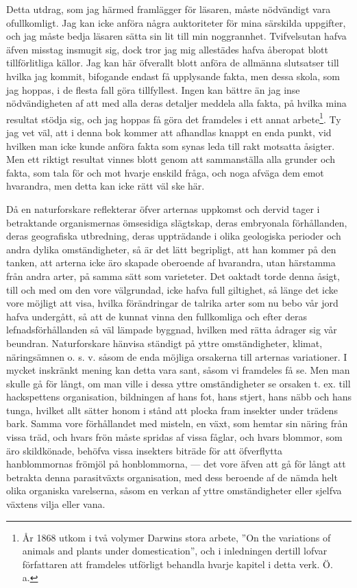 Detta utdrag, som jag härmed framlägger för läsaren, måste nödvändigt vara ofullkomligt. Jag kan icke anföra några auktoriteter för mina särskilda uppgifter, och jag måste bedja läsaren sätta sin lit till min noggrannhet. Tvifvelsutan hafva äfven misstag insmugit sig, dock tror jag mig allestädes hafva åberopat blott tillförlitliga källor. Jag kan här öfverallt blott anföra de allmänna slutsatser till hvilka jag kommit, bifogande endast få upplysande fakta, men dessa skola, som jag hoppas, i de flesta fall göra tillfyllest. Ingen kan bättre än jag inse nödvändigheten af att med alla deras detaljer meddela alla fakta, på hvilka mina resultat stödja sig, och jag hoppas få göra det framdeles i ett annat arbete\footnote{År 1868 utkom i två volymer Darwins stora arbete, ”On the variations of animals and plants under domestication”, och i inledningen dertill lofvar författaren att framdeles utförligt behandla hvarje kapitel i detta verk.
Ö. a.}. Ty jag vet väl, att i denna bok kommer att afhandlas knappt en enda punkt, vid hvilken man icke kunde anföra fakta som synas leda till rakt motsatta åsigter. Men ett riktigt resultat vinnes blott genom att sammanställa alla grunder och fakta, som tala för och mot hvarje enskild fråga, och noga afväga dem emot hvarandra, men detta kan icke rätt väl ske här.

Då en naturforskare reflekterar öfver arternas uppkomst och dervid tager i betraktande organismernas ömsesidiga slägtskap, deras embryonala förhållanden, deras geografiska utbredning, deras uppträdande i olika geologiska perioder och andra dylika omständigheter, så är det lätt begripligt, att han kommer på den tanken, att arterna icke äro skapade oberoende af hvarandra, utan härstamma från andra arter, på samma sätt som varieteter. Det oaktadt torde denna åsigt, till och med om den vore välgrundad, icke hafva full giltighet, så länge det icke vore möjligt att visa, hvilka förändringar de talrika arter som nu bebo vår jord hafva undergått, så att de kunnat vinna den fullkomliga och efter deras lefnadsförhållanden så väl lämpade byggnad, hvilken med rätta ådrager sig vår beundran. Naturforskare hänvisa ständigt på yttre omständigheter, klimat, näringsämnen o. s. v. såsom de enda möjliga orsakerna till arternas variationer. I mycket inskränkt mening kan detta vara sant, såsom vi framdeles få se. Men man skulle gå för långt, om man ville i dessa yttre omständigheter se orsaken t. ex. till hackspettens organisation, bildningen af hans fot, hans stjert, hans näbb och hans tunga, hvilket allt sätter honom i stånd att plocka fram insekter under trädens bark. Samma vore förhållandet med misteln, en växt, som hemtar sin näring från vissa träd, och hvars frön måste spridas af vissa fåglar, och hvars blommor, som äro skildkönade, behöfva vissa insekters biträde för att öfverflytta hanblommornas frömjöl på honblommorna, — det vore äfven att gå för långt att betrakta denna parasitväxts organisation, med dess beroende af de nämda helt olika organiska varelserna, såsom en verkan af yttre omständigheter eller sjelfva växtens vilja eller vana.

